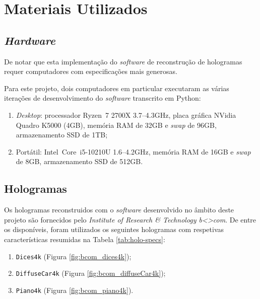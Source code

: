 \section{Materiais Utilizados}
\label{sec::tecno-ferr:materiais}

\subsection{\textit{Hardware}}
\label{ssec::tecno-ferr:materiais:hardware}

De notar que esta implementação do \textit{software} de reconstrução de hologramas requer computadores com especificações mais generosas.

Para este projeto, dois computadores em particular executaram as várias iterações de desenvolvimento do \textit{software} transcrito em Python:
\begin{enumerate}
    \item \textit{Desktop}: processador Ryzen\texttrademark~7 2700X \@ 3.7--4.3GHz, placa gráfica NVidia\textsuperscript{\textregistered} Quadro K5000 (4GB), memória RAM de 32GB e \textit{swap} de 96GB, armazenamento SSD de 1TB;
    \item Portátil: Intel\textsuperscript{\textregistered}~Core\texttrademark~i5-10210U \@ 1.6--4.2GHz, memória RAM de 16GB e \textit{swap} de 8GB, armazenamento SSD de 512GB.
\end{enumerate}

\subsection{Hologramas}
\label{ssec::tecno-ferr:materiais:hologramas}

Os hologramas reconstruidos com o \textit{software} desenvolvido no âmbito deste projeto são fornecidos pelo \textit{Institute of Research \& Technology b<>com}. De entre os disponíveis, foram utilizados os seguintes hologramas com respetivas características resumidas na Tabela \ref{tab:holo-specs}:

\begin{enumerate}
    \item \texttt{Dices4k} (Figura \ref{fig:bcom_dices4k});
    \item \texttt{DiffuseCar4k} (Figura \ref{fig:bcom_diffuseCar4k});
    \item \texttt{Piano4k} (Figura \ref{fig:bcom_piano4k}).
\end{enumerate}



